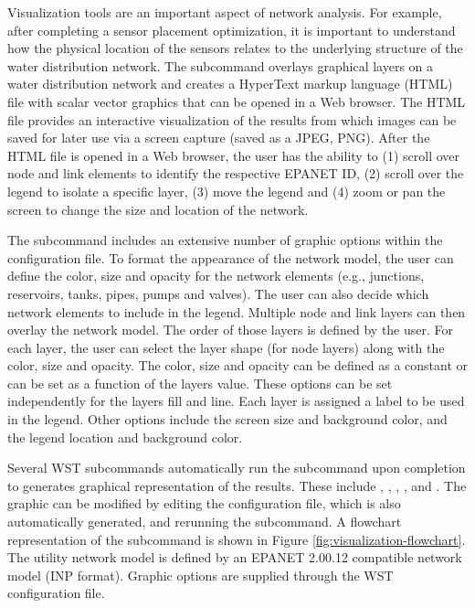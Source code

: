 Visualization tools are an important aspect of network analysis.  
For example, after completing a sensor placement optimization, it is important to 
understand how the physical location of the sensors relates to the underlying
structure of the water distribution network. The  subcommand 
overlays graphical layers on a water distribution network
and creates a HyperText markup language (HTML) file 
with scalar vector graphics that can be opened in a Web browser.  
The HTML file provides an interactive visualization of the results
from which images can be saved for later use via a screen capture (saved as a JPEG, PNG). 
After the HTML file is opened in a Web browser, the user has the ability to
(1) scroll over node and link elements to identify the respective EPANET ID, 
(2) scroll over the legend to isolate a specific layer, 
(3) move the legend and 
(4) zoom or pan the screen to change the size and location of the network.

The  subcommand includes an extensive number of graphic options within the 
configuration file.
To format the appearance of the network model, the user can define the color, size 
and opacity for the network elements (e.g., junctions, reservoirs, tanks, pipes, 
pumps and valves). The user can also decide 
which network elements to include in the legend.
Multiple node and link layers can then overlay the network model.  
The order of those layers is defined by the user.
For each layer, the user can select the layer shape (for node layers) along with the 
color, size and opacity. The color, size and opacity can be defined as a 
constant or can be set as a function of the layers value.
These options can be set independently for the layers fill and line.
Each layer is assigned a label to be used in the legend.
Other options include the screen size and background color, and the legend location
and background color.

Several WST subcommands automatically run the  subcommand 
upon completion to generates graphical representation of the results. These include 
, , , ,  and .
The graphic can be modified by editing the  
configuration file, which is also automatically generated, and rerunning the  subcommand.
A flowchart representation of the  subcommand is shown in Figure \ref{fig:visualization-flowchart}. 
The utility network model is defined by an EPANET 2.00.12 compatible network model (INP format). 
Graphic options are supplied through the  WST configuration file.

